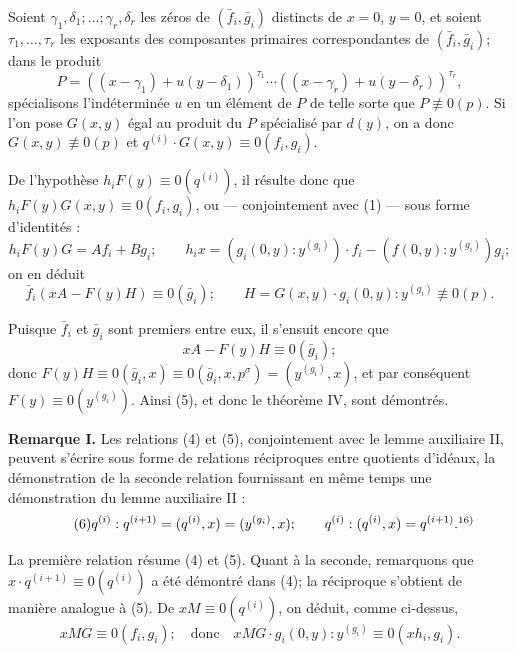 Soient $\gamma_1,\delta_1;\ldots;\gamma_r,\delta_r$ les zéros de $(\bar f_i,\bar g_i)$ distincts de $x=0$, $y=0$, et soient $\tau_1,\ldots,\tau_r$ les exposants des composantes primaires correspondantes de $(\bar f_i,\bar g_i)$; dans le produit
\[
P=((x-\gamma_1)+u(y-\delta_1))^{\tau_1}\cdots
((x-\gamma_r)+u(y-\delta_r))^{\tau_r},
\]
spécialisons l'indéterminée $u$ en un élément de $P$ de telle sorte que $P\not\equiv0(p)$. Si l'on pose $G(x,y)$ égal au produit du $P$ spécialisé par $d(y)$, on a donc $G(x,y)\not\equiv0(p)$ et $q^{(i)}\cdot G(x,y)\equiv0(f_i,g_i)$.

De l'hypothèse $h_iF(y)\equiv0(q^{(i)})$, il résulte donc que $h_iF(y)G(x,y)\equiv0(f_i,g_i)$, ou --- conjointement avec (1) --- sous forme d'identités :
\[
h_iF(y)G=Af_i+Bg_i;\qquad
h_ix=(g_i(0,y):y^{(g_i)})\cdot f_i-(f(0,y):y^{(g_i)})g_i;
\]
on en déduit
\[
\bar f_i(xA-F(y)H)\equiv0(\bar g_i);\qquad
H=G(x,y)\cdot g_i(0,y):y^{(g_i)}\not\equiv0(p).
\]

Puisque $\bar f_i$ et $\bar g_i$ sont premiers entre eux, il s'ensuit encore que
\[
xA-F(y)H\equiv0(\bar g_i);
\]
donc $F(y)H\equiv0(\bar g_i,x)\equiv0(\bar g_i,x,p^\sigma)=(y^{(g_i)},x)$, et par conséquent $F(y)\equiv0(y^{(g_i)})$. Ainsi (5), et donc le théorème IV, sont démontrés.

\textbf{Remarque I.} Les relations (4) et (5), conjointement avec le lemme auxiliaire II, peuvent s'écrire sous forme de relations réciproques entre quotients d'idéaux, la démonstration de la seconde relation fournissant en même temps une démonstration du lemme auxiliaire II :
\begin{equation}
\tag{6}
q^{(i)}:q^{(i+1)}=(q^{(i)},x)=(y^{(g_i)},x);\qquad
q^{(i)}:(q^{(i)},x)=q^{(i+1)}.\srcfnmark{16)}
\end{equation}

La première relation résume (4) et (5). Quant à la seconde, remarquons que $x\cdot q^{(i+1)}\equiv0(q^{(i)})$ a été démontré dans (4); la réciproque s'obtient de manière analogue à (5). De $xM\equiv0(q^{(i)})$, on déduit, comme ci-dessus,
\[
xMG\equiv0(f_i,g_i);\quad\text{donc}\quad
xMG\cdot g_i(0,y):y^{(g_i)}\equiv0(xh_i,g_i).
\]

